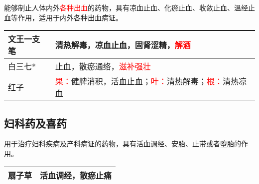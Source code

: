\documentclass[cn,blue,12pt,normal,founder]{elegantnote}
\newcommand{\redt}[1]{\textcolor{red}{{}#1}}      %
\begin{document}
能够制止人体内外\redt{各种出血}的药物，具有凉血止血、化瘀止血、收敛止血、温经止血等作用，适用于内外各种出血病证。

\begin{table}[H]
  \begin{tabular}{|l|l|}
  \hline
  文王一支笔 & 清热解毒，凉血止血，固肾涩精，\redt{解酒}    \\ \hline
  白三七* & 止血，散瘀通络，\redt{滋补强壮}   \\   \hline
  红子 & \redt{果：}健脾消积，活血止血；\redt{叶：}清热解毒；\redt{根：}清热凉血  \\  \hline
  \end{tabular}
\end{table}

\subsection{妇科药及喜药}

用于治疗妇科疾病及产科病证的药物，具有活血调经、安胎、止带或者堕胎的作用。

\begin{table}[H]
  \begin{tabular}{|l|l|}
  \hline
  扇子草 & 活血调经，散瘀止痛 \\ \hline
  \end{tabular}
\end{table}
\end{document}
